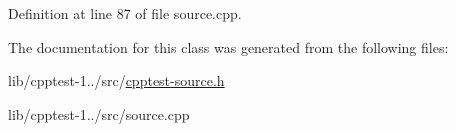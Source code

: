 Definition at line 87 of file source.\+cpp.



The documentation for this class was generated from the following files\+:\begin{DoxyCompactItemize}
\item 
lib/cpptest-\/1../src/\hyperlink{cpptest-source_8h}{cpptest-\/source.\+h}\item 
lib/cpptest-\/1../src/source.\+cpp\end{DoxyCompactItemize}
